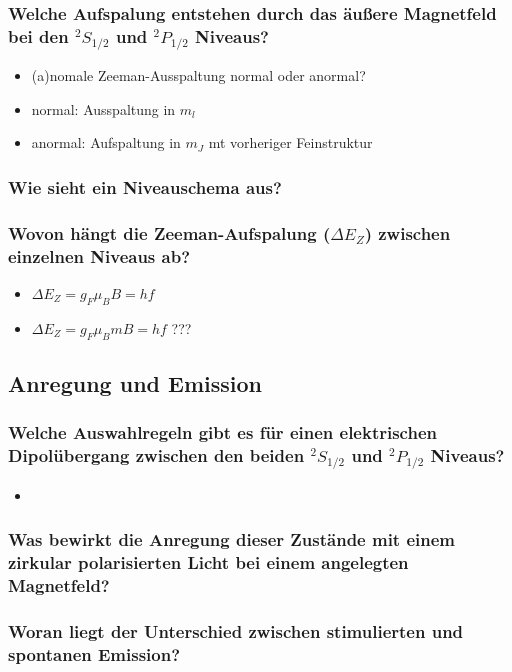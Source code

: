 \subsubsection[]{Welche Aufspalung entstehen durch das äußere Magnetfeld bei den $^2S_{1/2}$ und $^2P_{1/2}$ Niveaus?}
\begin{itemize}
    \item (a)nomale Zeeman-Ausspaltung
    \to normal oder anormal?
    \item normal: Ausspaltung in $m_l$
    \item anormal: Aufspaltung in $m_J$ mt vorheriger Feinstruktur
\end{itemize}
\subsubsection[]{Wie sieht ein Niveauschema aus?}
\subsubsection[]{Wovon hängt die Zeeman-Aufspalung ($\Delta E_Z$) zwischen einzelnen Niveaus ab?}
\begin{itemize}
    \item $\Delta E_Z=g_F\mu_B B=hf$
    \item $\Delta E_Z=g_F\mu_B m B=hf$ ???
\end{itemize}

\subsection{Anregung und Emission}
\subsubsection[]{Welche Auswahlregeln gibt es für einen elektrischen Dipolübergang zwischen den beiden $^2S_{1/2}$ und $^2P_{1/2}$ Niveaus?}
\begin{itemize}
    \item 
\end{itemize}
\subsubsection[]{Was bewirkt die Anregung dieser Zustände mit einem zirkular polarisierten Licht bei einem angelegten Magnetfeld?}
\subsubsection[]{Woran liegt der Unterschied zwischen stimulierten und spontanen Emission?}
